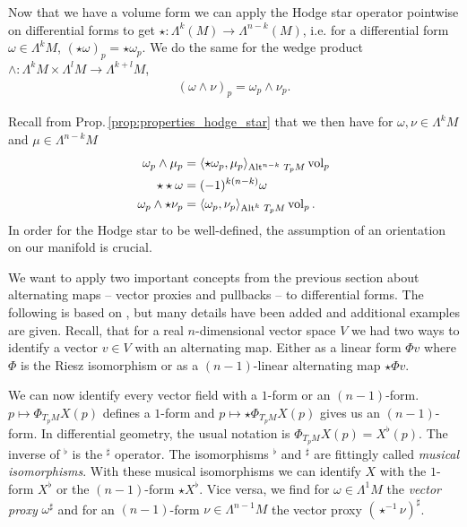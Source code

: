 \documentclass[../master_thesis.tex]{subfiles}
\begin{document}

Now that we have a volume form we can apply the Hodge star operator pointwise on differential forms
to get
$\star: \Lambda^k(M) \rightarrow \Lambda^{n-k}(M)$,
i.e. for a differential form $\omega \in \Lambda^k M$, $(\star \omega)_p = \star \omega_p$. 
We do the same for the wedge product
$\wedge: \Lambda^k M \times \Lambda^l M \rightarrow \Lambda^{k+l} M$,
\begin{align*}
    (\omega \wedge \nu )_p = \omega_p \wedge \nu_p. 
\end{align*} 

Recall from Prop.\,\ref{prop:properties_hodge_star} that we then have for $\omega, \nu \in \Lambda^k M$ and 
$\mu \in \Lambda^{n-k} M$
\begin{align*}
    \omega_p \wedge \mu_p &= \langle \star \omega_p, \mu_p \rangle _{{\operatorname{Alt}^{n-k}\,T_p M}} \operatorname{vol}_p
    \\ \star \star \omega &= (-1)^{k(n-k)} \omega
    \\ \omega_p \wedge \star \nu_p &= \langle \omega_p, \nu_p \rangle _{{\operatorname{Alt}^{k}\,T_p M}} \operatorname{vol}_p.
\end{align*}
In order for 
the Hodge star to be well-defined, the assumption of an orientation on our 
manifold is crucial. 

We want to apply two important concepts from the previous section about 
alternating maps -- vector proxies and pullbacks -- to differential forms.
The following is based on \cite[Ch.\,6]{arnold}, 
but many details have been
added and additional examples are given.
Recall, that for a real $n$-dimensional vector space $V$ we had two 
ways to identify a vector $v\in V$ with an alternating map. Either as a 
linear form $\Phi v$ where $\Phi$ is the Riesz isomorphism or as a 
$(n-1)$-linear alternating map $\star \Phi v$. 

We can now identify every vector field with a $1$-form or 
an $(n-1)$-form. $p \mapsto \Phi_{T_p M} X(p)$ defines a $1$-form and  
$p \mapsto \star \Phi_{T_p M} X(p)$ gives us an $(n-1)$-form. In differential 
geometry, the usual notation is
$\Phi_{T_p M} X(p) = X^\flat(p)$. The inverse of $^\flat$ is the $^\sharp$ operator.
The isomorphisms $^\flat$ and $^\sharp$ 
are fittingly called \textit{musical isomorphisms}. 
With these musical isomorphisms we can identify $X$ with the $1$-form 
$X^\flat$ or the $(n-1)$-form $\star X^\flat$. Vice versa, we find 
for $\omega \in \Lambda^1 M$ the \textit{vector proxy} $\omega ^\sharp$ and for 
an $(n-1)$-form $\nu \in \Lambda^{n-1} M$ the vector proxy $(\star^{-1} \nu)^\sharp$.
\end{document}

